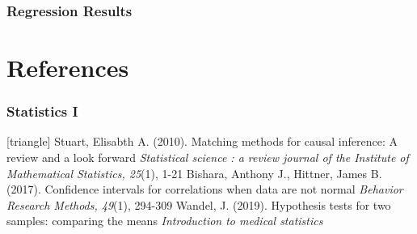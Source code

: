 \documentclass[xcolor=table]{beamer}
\begin{document}
\begin{frame}
	\frametitle{Regression Results}
	
	\begin{table}[h!]\caption{Matched ROIs regression results}
	\end{table}
\end{frame}


\appendix

\section{References}
\begin{frame}
	\frametitle{Statistics I}
	\footnotesize{
		\begin{thebibliography}{99}
			[triangle]
			 Stuart, Elisabth A. (2010).
			\newblock Matching methods for causal inference: A review and a look forward
			\newblock \textit{Statistical science : a review journal of the Institute of Mathematical Statistics, 25}(1), 1-21
			\vspace{1mm}
			 Bishara, Anthony J., Hittner, James B. (2017).
			\newblock Confidence intervals for correlations when data are not normal
			\newblock \textit{Behavior Research Methods, 49}(1), 294-309
			\vspace{1mm}
			 Wandel, J. (2019).
			\newblock Hypothesis tests for two samples: comparing the means
			\newblock \textit{Introduction to medical statistics}
		\end{thebibliography}
	}
\end{frame}
\end{document}
